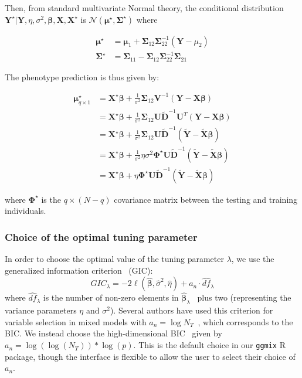 \documentclass[10pt,letterpaper]{article}
\newcommand{\bX}{\textbf{X}}
\newcommand{\bY}{\textbf{Y}}
\newcommand{\bD}{\textbf{D}}
\newcommand{\bXtilde}{\widetilde{\bX}}
\newcommand{\bYtilde}{\widetilde{\bY}}
\newcommand{\bDtilde}{\widetilde{\bD}}
\newcommand{\bU}{\textbf{U}}
\newcommand{\bV}{\textbf{V}}
\newcommand{\bSigma}{\boldsymbol{\Sigma}}
\newcommand{\bmu}{\boldsymbol{\mu}}
\newcommand{\bbeta}{\boldsymbol{\beta}}
\newcommand{\bPhi}{\boldsymbol{\Phi}}
\begin{document}
Then, from standard multivariate Normal theory, the conditional distribution $\bY^\star | \bY, \eta, \sigma^2, \bbeta,\bX, \bX^\star$ is $\mathcal{N}(\bmu^\star, \bSigma^\star)$ where

\begin{align}
\bmu^\star &= \bmu_1 + \bSigma_{12} \bSigma_{22}^{-1} (\bY - \mu_2) \\
\bSigma^\star & = \bSigma_{11} - \bSigma_{12} \bSigma_{22}^{-1} \bSigma_{21}
\end{align}

The phenotype prediction is thus given by:

\begin{align}
\bmu^\star_{q \times 1} & = \bX^\star \bbeta + \frac{1}{\sigma^2} \bSigma_{12} \bV^{-1} (\bY - \bX \bbeta)\\
& = \bX^\star \bbeta + \frac{1}{\sigma^2} \bSigma_{12} \bU \bDtilde^{-1} \bU^T (\bY - \bX \bbeta)\\
& = \bX^\star \bbeta + \frac{1}{\sigma^2} \bSigma_{12} \bU \bDtilde^{-1} (\bYtilde - \bXtilde \bbeta ) \\
& = \bX^\star \bbeta + \frac{1}{\sigma^2} \eta \sigma^2 \bPhi^\star \bU \bDtilde^{-1} (\bYtilde - \bXtilde \bbeta ) \\
& = \bX^\star \bbeta +  \eta  \bPhi^\star \bU \bDtilde^{-1} (\bYtilde - \bXtilde \bbeta )
\end{align}

where $\bPhi^\star$ is the $q \times (N-q)$ covariance matrix between the testing and training individuals.



\subsubsection*{Choice of the optimal tuning parameter} \label{subsubsec:gic}

In order to choose the optimal value of the tuning parameter $\lambda$, we use the generalized information criterion~\cite{nishii1984asymptotic} (GIC):
\begin{equation}
GIC_{\lambda} = -2 \ell(\widehat{\bbeta}, \widehat{\sigma}^2, \widehat{\eta}) + a_n \cdot \widehat{df}_{\lambda}
\end{equation}
where $\widehat{df}_{\lambda}$ is the number of non-zero elements in $\widehat{\bbeta}_{\lambda}$~\cite{zou2007degrees} plus two (representing the variance parameters $\eta$ and $\sigma^2$). Several authors have used this criterion for variable selection in mixed models with $a_n = \log N_T$~\cite{bondell2010joint,schelldorfer2011estimation}, which corresponds to the BIC. We instead choose the high-dimensional BIC~\cite{fan2013tuning} given by $a_n = \log(\log(N_T)) * \log(p)$. This is the default choice in our \texttt{ggmix} R package, though the interface is flexible to allow the user to select their choice of $a_n$.
\end{document}
